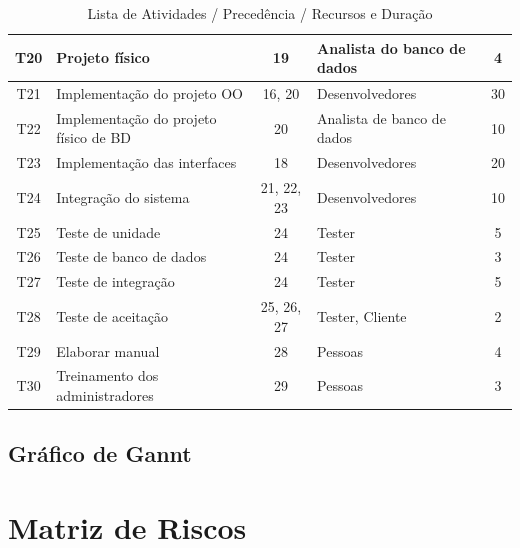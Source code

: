 \documentclass[a4paper,11pt]{article}
\begin{document}
\begin{center}
\begin{table}[H]
\begin{tabularx}{\textwidth}{c|X|c|X|c}
			T20 & Projeto físico & 19 & Analista do banco de dados & 4\\ \hline
			T21 & Implementação do projeto OO & 16, 20 & Desenvolvedores & 30 \\ \hline
			T22 & Implementação do projeto físico de BD& 20 & Analista de banco de dados & 10\\ \hline
			T23 & Implementação das interfaces & 18 & Desenvolvedores & 20\\ \hline
			T24 & Integração do sistema& 21, 22, 23 & Desenvolvedores & 10\\ \hline
			T25 & Teste de unidade & 24 & Tester & 5 \\ \hline
			T26 & Teste de banco de dados & 24 & Tester & 3 \\ \hline
			T27 & Teste de integração & 24 & Tester & 5\\ \hline
			T28 & Teste de aceitação& 25, 26, 27 & Tester, Cliente & 2\\ \hline
			T29 & Elaborar manual & 28 & Pessoas & 4\\ \hline
			T30 & Treinamento dos administradores & 29 & Pessoas & 3\\ \hline
		\end{tabularx}
		\caption{Lista de Atividades / Precedência / Recursos e Duração}
	\end{table}
	\end{center}
	\subsection{Gráfico de Gannt}
	
\section{Matriz de Riscos}
	
\end{document}
